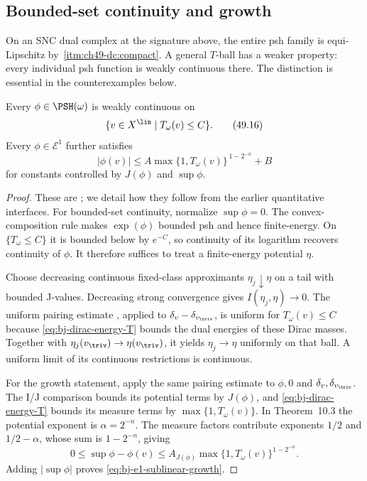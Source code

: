 \subsection{Bounded-set continuity and growth}
\label{sec:ch49-bounded}

On an SNC dual complex at the signature above, the entire psh family
is equi-Lipschitz by \,\cref{itm:ch49-dc:compact}.
A general $T$-ball has a weaker property: every individual psh function
is weakly continuous there.  The distinction is essential in the
counterexamples below.

\begin{proposition}\label{prop:bj-psh-continuous-bounded-valuations}
Every $\phi\in\PSH(\omega)$ is weakly continuous on
\[
                         \{v\in X^{\lin}\mid T_\omega(v)\leq C\}.
\tag{49.16}\label{eq:bj-T-ball}
\]
Every $\phi\in\mathcal E^1$ further satisfies
\[
 |\phi(v)|\leq A\max\{1,T_\omega(v)\}^{\,1-2^{-n}}+B
\tag{49.17}\label{eq:bj-e1-sublinear-growth}
\]
for constants controlled by $J(\phi)$ and $\sup\phi$.
\end{proposition}

\begin{proof}
These are \cite[Theorems~11.11--11.12]{BJ22}; we detail how they
follow from the earlier quantitative interfaces.
For bounded-set continuity, normalize $\sup\phi=0$.
The convex-composition rule \cite[Corollary~4.11]{BJ22} makes
$\exp(\phi)$ bounded psh and hence finite-energy.
On $\{T_\omega\le C\}$ it is bounded below by $e^{-C}$,
so continuity of its logarithm recovers continuity of $\phi$.
It therefore suffices to treat a finite-energy potential $\eta$.

Choose decreasing continuous fixed-class approximants
$\eta_j\downarrow\eta$ on a tail with bounded J-values.
Decreasing strong convergence gives $I(\eta_j,\eta)\to0$.
The uniform pairing estimate \cite[Theorem~10.3]{BJ22}, applied to
$\delta_v-\delta_{v_{\triv}}$, is uniform for $T_\omega(v)\le C$
because \eqref{eq:bj-dirac-energy-T} bounds the dual energies of
these Dirac masses.  Together with
$\eta_j(v_{\triv})\to\eta(v_{\triv})$, it yields
$\eta_j\to\eta$ uniformly on that ball.
A uniform limit of its continuous restrictions is continuous.

For the growth statement, apply the same pairing estimate to
$\phi,0$ and $\delta_v,\delta_{v_{\triv}}$.
The I/J comparison bounds its potential terms by $J(\phi)$,
and \eqref{eq:bj-dirac-energy-T} bounds its measure terms by
$\max\{1,T_\omega(v)\}$.  In Theorem~10.3 the potential exponent
is $\alpha=2^{-n}$.  The measure factors contribute exponents
$1/2$ and $1/2-\alpha$, whose sum is $1-2^{-n}$, giving
\[
 0\le\sup\phi-\phi(v)\le
 A_{J(\phi)}\max\{1,T_\omega(v)\}^{1-2^{-n}}.
\]
Adding $|\sup\phi|$ proves \eqref{eq:bj-e1-sublinear-growth}.
\end{proof}

